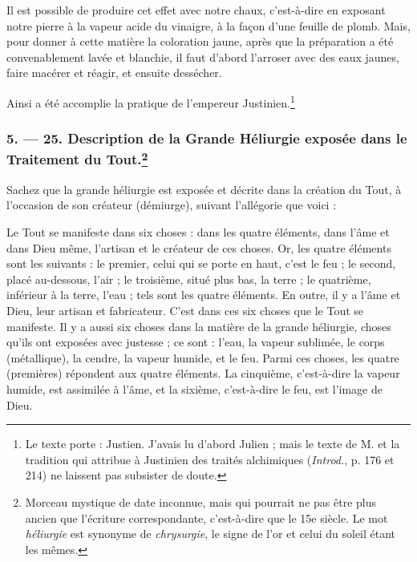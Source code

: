 \documentclass[a4paper, 11pt, oneside, polutonikogreek, french]{article}
\begin{document}
Il est possible de produire cet effet avec notre chaux, c'est-à-dire en exposant notre pierre à la vapeur acide du vinaigre, à la façon d'une feuille de plomb. Mais, pour donner à cette matière la coloration jaune, après que la préparation a été convenablement lavée et blanchie, il faut d'abord l'arroser avec des eaux jaunes, faire macérer et réagir, et ensuite dessécher.

Ainsi a été accomplie la pratique de l'empereur Justinien.\footnote{Le texte porte : Justien. J'avais lu d'abord Julien ; mais le texte de M. et la tradition qui attribue à Justinien des traités alchimiques (\emph{Introd.}, p. 176 et 214) ne laissent pas subsister de doute.}

\bigskip
\centerline{\EightStarTaper}
\centerline{\EightStarTaper\EightStarTaper}
\bigskip

\subsubsection[5. --- 25. Description de la Grande Héliurgie exposée dans le Traitement du Tout.]{5. --- 25. Description de la Grande Héliurgie exposée dans le Traitement du Tout.\footnote{Morceau mystique de date inconnue, mais qui pourrait ne pas être plus ancien que l'écriture correspondante, c'est-à-dire que le 15e siècle. Le mot \emph{héliurgie} est synonyme de \emph{chrysurgie}, le signe de l'or et celui du soleil étant les mêmes.}}

Sachez que la grande héliurgie est exposée et décrite dans la création du Tout, à l'occasion de son créateur (démiurge), suivant l'allégorie que voici :

Le Tout se manifeste dans six choses : dans les quatre éléments, dans l'âme et dans Dieu même, l'artisan et le créateur de ces choses. Or, les quatre éléments sont les suivants : le premier, celui qui se porte en haut, c'est le feu ; le second, placé au-dessous, l'air ; le troisième, situé plus bas, la terre ; le quatrième, inférieur à la terre, l'eau ; tels sont les quatre éléments. En outre, il y a l'âme et Dieu, leur artisan et fabricateur. C'est dans ces six choses que le Tout se manifeste. Il y a aussi six choses dans la matière de la grande héliurgie, choses qu'ils ont exposées avec justesse ; ce sont : l'eau, la vapeur sublimée, le corps (métallique), la cendre, la vapeur humide, et le feu. Parmi ces choses, les quatre (premières) répondent aux quatre éléments. La cinquième, c'est-à-dire la vapeur humide, est assimilée à l'âme, et la sixième, c'est-à-dire le feu, est l'image de Dieu.
\end{document}
